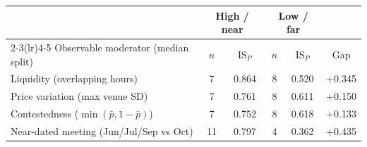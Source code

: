 \begin{tabular}{lccccc}
\toprule
& \multicolumn{2}{c}{High / near} & \multicolumn{2}{c}{Low / far} & \\
\cmidrule(lr){2-3}\cmidrule(lr){4-5}
Observable moderator (median split) & $n$ & IS$_P$ & $n$ & IS$_P$ & Gap \\
\midrule
Liquidity (overlapping hours) & 7 & 0.864 & 8 & 0.520 & +0.345 \\
Price variation (max venue SD) & 7 & 0.761 & 8 & 0.611 & +0.150 \\
Contestedness ($\min(\bar p,1-\bar p)$) & 7 & 0.752 & 8 & 0.618 & +0.133 \\
Near-dated meeting (Jun/Jul/Sep vs Oct) & 11 & 0.797 & 4 & 0.362 & +0.435 \\
\bottomrule
\end{tabular}